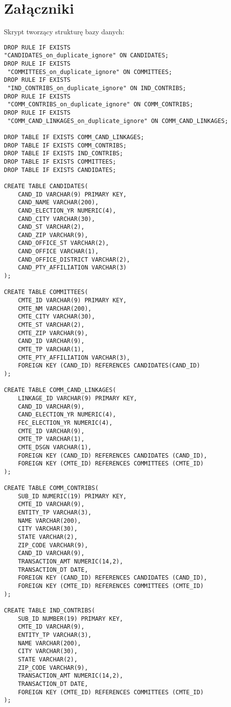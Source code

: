 \documentclass[10pt,a4paper]{article}
\begin{document}
\section{Załączniki}
Skrypt tworzący strukturę bazy danych:
\begin{lstlisting}[style=BashInputStyle]
DROP RULE IF EXISTS 
"CANDIDATES_on_duplicate_ignore" ON CANDIDATES;
DROP RULE IF EXISTS
 "COMMITTEES_on_duplicate_ignore" ON COMMITTEES;
DROP RULE IF EXISTS
 "IND_CONTRIBS_on_duplicate_ignore" ON IND_CONTRIBS;
DROP RULE IF EXISTS
 "COMM_CONTRIBS_on_duplicate_ignore" ON COMM_CONTRIBS;
DROP RULE IF EXISTS
 "COMM_CAND_LINKAGES_on_duplicate_ignore" ON COMM_CAND_LINKAGES;

DROP TABLE IF EXISTS COMM_CAND_LINKAGES;
DROP TABLE IF EXISTS COMM_CONTRIBS;
DROP TABLE IF EXISTS IND_CONTRIBS;
DROP TABLE IF EXISTS COMMITTEES;
DROP TABLE IF EXISTS CANDIDATES;

CREATE TABLE CANDIDATES(
    CAND_ID VARCHAR(9) PRIMARY KEY,
    CAND_NAME VARCHAR(200),
    CAND_ELECTION_YR NUMERIC(4),
    CAND_CITY VARCHAR(30),
    CAND_ST VARCHAR(2),
    CAND_ZIP VARCHAR(9),
    CAND_OFFICE_ST VARCHAR(2),
    CAND_OFFICE VARCHAR(1),
    CAND_OFFICE_DISTRICT VARCHAR(2),
    CAND_PTY_AFFILIATION VARCHAR(3)
);

CREATE TABLE COMMITTEES(
    CMTE_ID VARCHAR(9) PRIMARY KEY,
    CMTE_NM VARCHAR(200),
    CMTE_CITY VARCHAR(30),
    CMTE_ST VARCHAR(2),
    CMTE_ZIP VARCHAR(9),
    CAND_ID VARCHAR(9),
    CMTE_TP VARCHAR(1),
    CMTE_PTY_AFFILIATION VARCHAR(3),
    FOREIGN KEY (CAND_ID) REFERENCES CANDIDATES(CAND_ID)
);

CREATE TABLE COMM_CAND_LINKAGES(
    LINKAGE_ID VARCHAR(9) PRIMARY KEY,
    CAND_ID VARCHAR(9),
    CAND_ELECTION_YR NUMERIC(4),
    FEC_ELECTION_YR NUMERIC(4),
    CMTE_ID VARCHAR(9),
    CMTE_TP VARCHAR(1),
    CMTE_DSGN VARCHAR(1),
    FOREIGN KEY (CAND_ID) REFERENCES CANDIDATES (CAND_ID),
    FOREIGN KEY (CMTE_ID) REFERENCES COMMITTEES (CMTE_ID)
);

CREATE TABLE COMM_CONTRIBS(
    SUB_ID NUMERIC(19) PRIMARY KEY,
    CMTE_ID VARCHAR(9),
    ENTITY_TP VARCHAR(3),
    NAME VARCHAR(200),
    CITY VARCHAR(30),
    STATE VARCHAR(2),
    ZIP_CODE VARCHAR(9),
    CAND_ID VARCHAR(9),
    TRANSACTION_AMT NUMERIC(14,2),
    TRANSACTION_DT DATE,
    FOREIGN KEY (CAND_ID) REFERENCES CANDIDATES (CAND_ID),
    FOREIGN KEY (CMTE_ID) REFERENCES COMMITTEES (CMTE_ID)
);

CREATE TABLE IND_CONTRIBS(
    SUB_ID NUMBER(19) PRIMARY KEY,
    CMTE_ID VARCHAR(9),
    ENTITY_TP VARCHAR(3),
    NAME VARCHAR(200),
    CITY VARCHAR(30),
    STATE VARCHAR(2),
    ZIP_CODE VARCHAR(9),
    TRANSACTION_AMT NUMERIC(14,2),
    TRANSACTION_DT DATE,
    FOREIGN KEY (CMTE_ID) REFERENCES COMMITTEES (CMTE_ID)
);


\end{lstlisting}
\end{document}
